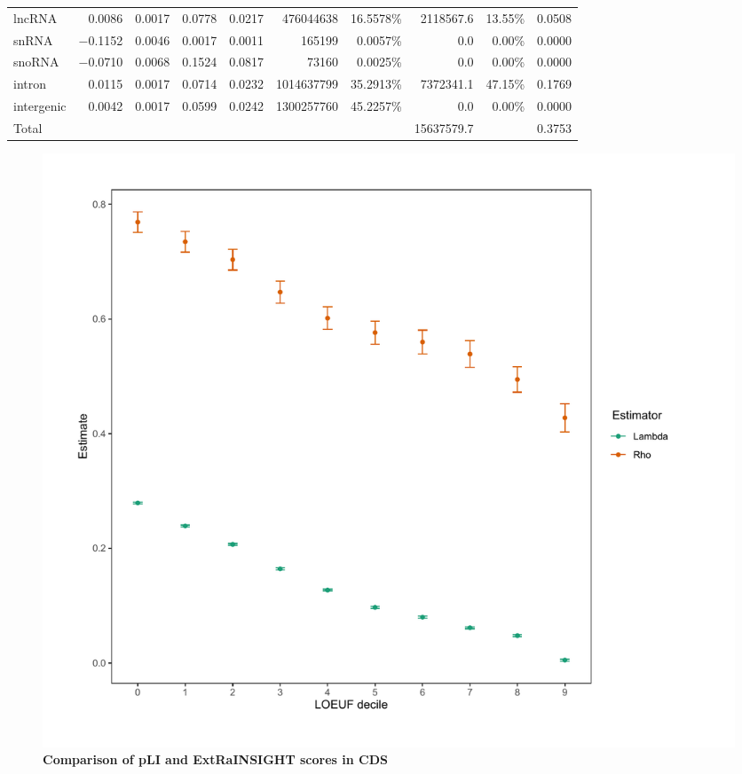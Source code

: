 \documentclass[11pt]{article}
\begin{document}
\begin{table}
\begin{footnotesize}
\begin{tabular}{lrrrrrrrrr}
lncRNA & 0.0086 & 0.0017 & 0.0778 & 0.0217 & 476044638 & 16.5578\% &  2118567.6 & 13.55\% & 0.0508\\
snRNA & $-$0.1152 & 0.0046 & 0.0017 & 0.0011 & 165199 & 0.0057\% & 0.0 & 0.00\% & 0.0000\\
snoRNA & $-$0.0710 & 0.0068 & 0.1524 & 0.0817 & 73160 & 0.0025\% & 0.0 & 0.00\% & 0.0000\\
intron & 0.0115 & 0.0017 & 0.0714 & 0.0232 & 1014637799 & 35.2913\% &  7372341.1 & 47.15\% & 0.1769\\
intergenic & 0.0042 & 0.0017 & 0.0599 & 0.0242 & 1300257760 & 45.2257\% & 0.0 & 0.00\% & 0.0000\\
    \hline
Total &  &  &  &  & & & 15637579.7 &  & 0.3753\\
    \hline
  \end{tabular}
  \end{footnotesize}
\end{table}
\clearpage

\begin{figure}[t]
    \centering
    \includegraphics[width=0.75\linewidth]{figures/LOEUF.pdf}
    \caption{\textbf{Comparison of pLI and ExtRaINSIGHT scores in CDS}}
    \label{fig:loeuf}
\end{figure}

\clearpage 

\end{document}

